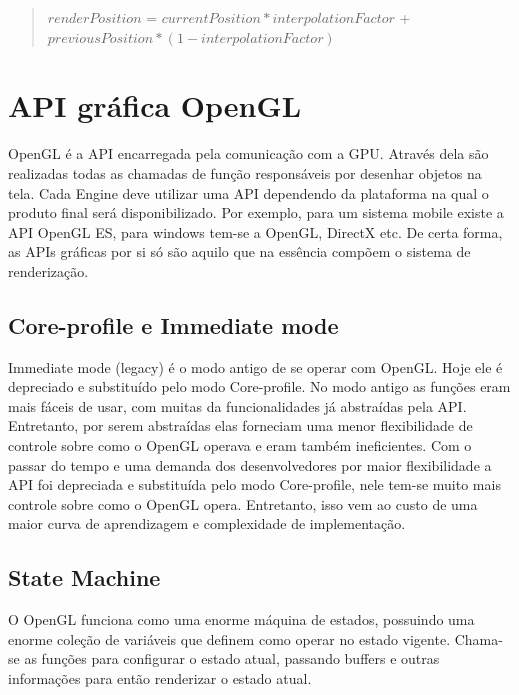 \documentclass[12pt, 
openright, 
oneside, 
a4paper,    
brazil]{facom-ufu-abntex2}
\begin{document}
\begin{quote}
$renderPosition$ = $currentPosition * interpolationFactor$ + $previousPosition * (1 - interpolationFactor)$
\end{quote}

\section{API gráfica OpenGL}
OpenGL é a API encarregada pela comunicação com a GPU. Através dela são realizadas todas as chamadas de função responsáveis por desenhar objetos na tela. Cada Engine deve utilizar uma API dependendo da plataforma na qual o produto final será disponibilizado. Por exemplo, para um sistema mobile existe a API OpenGL ES, para windows tem-se a OpenGL, DirectX etc. De certa forma, as APIs gráficas por si só são aquilo que na essência compõem o sistema de renderização.  
\subsection{Core-profile e Immediate mode}
Immediate mode (legacy) é o modo antigo de se operar com OpenGL. Hoje ele é depreciado e substituído pelo modo Core-profile. No modo antigo as funções eram mais fáceis de usar, com muitas da funcionalidades já abstraídas pela API. Entretanto, por serem abstraídas elas forneciam uma menor flexibilidade de controle sobre como o OpenGL  operava e eram também ineficientes\cite{LearnOpenGL}. Com o passar do tempo e uma demanda dos desenvolvedores por maior flexibilidade a API foi depreciada e substituída pelo modo Core-profile, nele tem-se muito mais controle sobre como o OpenGL opera. Entretanto, isso vem ao custo de uma maior curva de aprendizagem e complexidade de implementação.
\subsection{State Machine}
O OpenGL funciona como uma enorme máquina de estados, possuindo uma enorme coleção de variáveis que definem como  operar no estado vigente. Chama-se as funções para configurar o estado atual, passando buffers e outras informações para então renderizar o estado atual.
\end{document}
